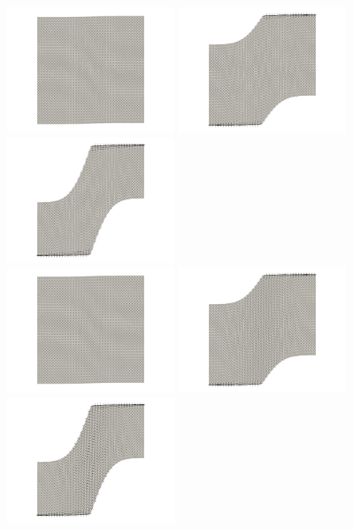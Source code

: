 \begin{center}
\includegraphics[width=5cm]{python_codes/fieldstone_89/results/shearband/old_dirs0000}
\includegraphics[width=5cm]{python_codes/fieldstone_89/results/shearband/old_dirs0005}
\includegraphics[width=5cm]{python_codes/fieldstone_89/results/shearband/old_dirs0010}\\
\includegraphics[width=5cm]{python_codes/fieldstone_89/results/shearband/new_dirs0000}
\includegraphics[width=5cm]{python_codes/fieldstone_89/results/shearband/new_dirs0005}
\includegraphics[width=5cm]{python_codes/fieldstone_89/results/shearband/new_dirs0010}\\

\end{center}
